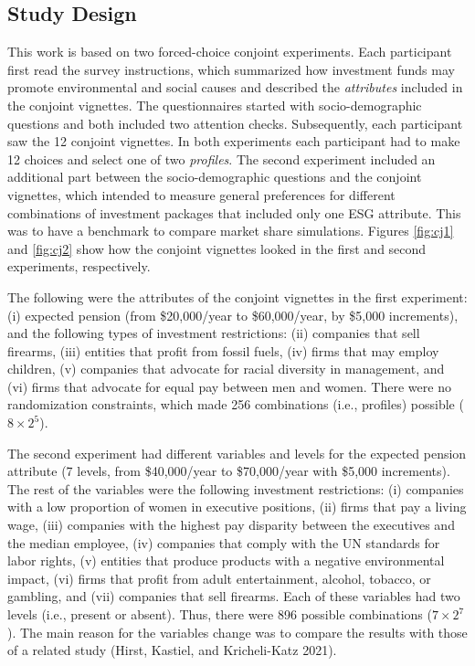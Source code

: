 \documentclass[
  12pt,
]{article}
\begin{document}
\hypertarget{study-design}{%
\subsection{Study Design}\label{study-design}}

This work is based on two forced-choice conjoint experiments. Each participant first read the survey instructions, which summarized how investment funds may promote environmental and social causes and described the \emph{attributes} included in the conjoint vignettes. The questionnaires started with socio-demographic questions and both included two attention checks. Subsequently, each participant saw the 12 conjoint vignettes. In both experiments each participant had to make 12 choices and select one of two \emph{profiles}. The second experiment included an additional part between the socio-demographic questions and the conjoint vignettes, which intended to measure general preferences for different combinations of investment packages that included only one ESG attribute. This was to have a benchmark to compare market share simulations. Figures \ref{fig:cj1} and \ref{fig:cj2} show how the conjoint vignettes looked in the first and second experiments, respectively.

The following were the attributes of the conjoint vignettes in the first experiment: (i) expected pension (from \$20,000/year to \$60,000/year, by \$5,000 increments), and the following types of investment restrictions: (ii) companies that sell firearms, (iii) entities that profit from fossil fuels, (iv) firms that may employ children, (v) companies that advocate for racial diversity in management, and (vi) firms that advocate for equal pay between men and women. There were no randomization constraints, which made 256 combinations (i.e., profiles) possible (\(8 \times 2^5\)).

The second experiment had different variables and levels for the expected pension attribute (7 levels, from \$40,000/year to \$70,000/year with \$5,000 increments). The rest of the variables were the following investment restrictions: (i) companies with a low proportion of women in executive positions, (ii) firms that pay a living wage, (iii) companies with the highest pay disparity between the executives and the median employee, (iv) companies that comply with the UN standards for labor rights, (v) entities that produce products with a negative environmental impact, (vi) firms that profit from adult entertainment, alcohol, tobacco, or gambling, and (vii) companies that sell firearms. Each of these variables had two levels (i.e., present or absent). Thus, there were 896 possible combinations (\(7 \times 2^7\)). The main reason for the variables change was to compare the results with those of a related study (Hirst, Kastiel, and Kricheli-Katz 2021).
\end{document}

